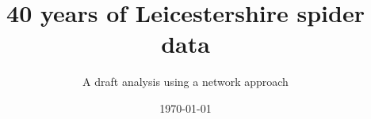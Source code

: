 \title[40 years of spider data]{40 years of Leicestershire spider data} %
\subtitle{A draft analysis using a network approach}


\date{\today} %

